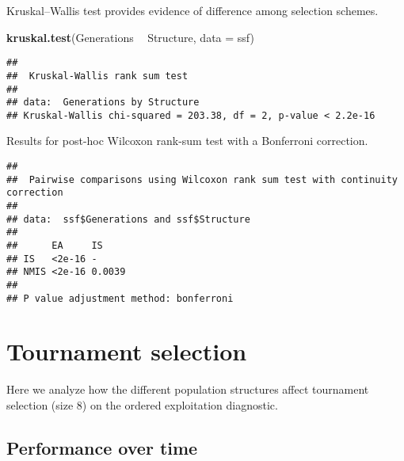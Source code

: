 \documentclass[]{book}
\newenvironment{Shaded}{\begin{snugshade}}{\end{snugshade}}
\newcommand{\DataTypeTok}[1]{\textcolor[rgb]{0.13,0.29,0.53}{#1}}
\newcommand{\KeywordTok}[1]{\textcolor[rgb]{0.13,0.29,0.53}{\textbf{#1}}}
\newcommand{\NormalTok}[1]{#1}
\newcommand{\OperatorTok}[1]{\textcolor[rgb]{0.81,0.36,0.00}{\textbf{#1}}}
\newcommand{\OtherTok}[1]{\textcolor[rgb]{0.56,0.35,0.01}{#1}}
\newcommand{\StringTok}[1]{\textcolor[rgb]{0.31,0.60,0.02}{#1}}
\begin{document}
Kruskal--Wallis test provides evidence of difference among selection schemes.

\begin{Shaded}
\begin{Highlighting}[]
\KeywordTok{kruskal.test}\NormalTok{(Generations }\OperatorTok{~}\StringTok{ }\NormalTok{Structure, }\DataTypeTok{data =}\NormalTok{ ssf)}
\end{Highlighting}
\end{Shaded}

\begin{verbatim}
## 
##  Kruskal-Wallis rank sum test
## 
## data:  Generations by Structure
## Kruskal-Wallis chi-squared = 203.38, df = 2, p-value < 2.2e-16
\end{verbatim}

Results for post-hoc Wilcoxon rank-sum test with a Bonferroni correction.

\begin{Shaded}
\end{Shaded}

\begin{verbatim}
## 
##  Pairwise comparisons using Wilcoxon rank sum test with continuity correction 
## 
## data:  ssf$Generations and ssf$Structure 
## 
##      EA     IS    
## IS   <2e-16 -     
## NMIS <2e-16 0.0039
## 
## P value adjustment method: bonferroni
\end{verbatim}

\hypertarget{tournament-selection-9}{%
\section{Tournament selection}\label{tournament-selection-9}}

Here we analyze how the different population structures affect tournament selection (size 8) on the ordered exploitation diagnostic.

\hypertarget{performance-over-time-22}{%
\subsection{Performance over time}\label{performance-over-time-22}}
\end{document}

